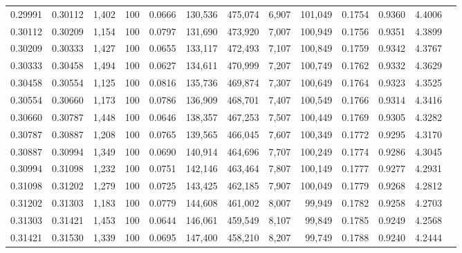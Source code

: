 \begin{tabular}{rrrrrrrrrrrrr}
0.29991 & 0.30112 & 1,402 & 100 &                                     0.0666 & 130,536 & 475,074 &   6,907 & 101,049 & 0.1754 & 0.9360 & 4.4006 \\
0.30112 & 0.30209 & 1,154 & 100 &                                     0.0797 & 131,690 & 473,920 &   7,007 & 100,949 & 0.1756 & 0.9351 & 4.3899 \\
0.30209 & 0.30333 & 1,427 & 100 &                                     0.0655 & 133,117 & 472,493 &   7,107 & 100,849 & 0.1759 & 0.9342 & 4.3767 \\
0.30333 & 0.30458 & 1,494 & 100 &                                     0.0627 & 134,611 & 470,999 &   7,207 & 100,749 & 0.1762 & 0.9332 & 4.3629 \\
0.30458 & 0.30554 & 1,125 & 100 &                                     0.0816 & 135,736 & 469,874 &   7,307 & 100,649 & 0.1764 & 0.9323 & 4.3525 \\
0.30554 & 0.30660 & 1,173 & 100 &                                     0.0786 & 136,909 & 468,701 &   7,407 & 100,549 & 0.1766 & 0.9314 & 4.3416 \\
0.30660 & 0.30787 & 1,448 & 100 &                                     0.0646 & 138,357 & 467,253 &   7,507 & 100,449 & 0.1769 & 0.9305 & 4.3282 \\
0.30787 & 0.30887 & 1,208 & 100 &                                     0.0765 & 139,565 & 466,045 &   7,607 & 100,349 & 0.1772 & 0.9295 & 4.3170 \\
0.30887 & 0.30994 & 1,349 & 100 &                                     0.0690 & 140,914 & 464,696 &   7,707 & 100,249 & 0.1774 & 0.9286 & 4.3045 \\
0.30994 & 0.31098 & 1,232 & 100 &                                     0.0751 & 142,146 & 463,464 &   7,807 & 100,149 & 0.1777 & 0.9277 & 4.2931 \\
0.31098 & 0.31202 & 1,279 & 100 &                                     0.0725 & 143,425 & 462,185 &   7,907 & 100,049 & 0.1779 & 0.9268 & 4.2812 \\
0.31202 & 0.31303 & 1,183 & 100 &                                     0.0779 & 144,608 & 461,002 &   8,007 &  99,949 & 0.1782 & 0.9258 & 4.2703 \\
0.31303 & 0.31421 & 1,453 & 100 &                                     0.0644 & 146,061 & 459,549 &   8,107 &  99,849 & 0.1785 & 0.9249 & 4.2568 \\
0.31421 & 0.31530 & 1,339 & 100 &                                     0.0695 & 147,400 & 458,210 &   8,207 &  99,749 & 0.1788 & 0.9240 & 4.2444 \\

\end{tabular}
